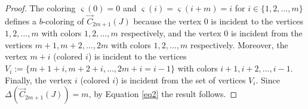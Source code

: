 \documentclass[10pt,a4paper]{amsart}
\begin{document}
\begin{proof}
The coloring $\varsigma(0)=0$ and $\varsigma(i)=\varsigma(i+m)=i$ for $i\in \{1,2,\ldots,m\}$ defines a $b$-coloring of $\overrightarrow{C}_{2m+1}(J)$ because the vertex $0$ is incident to the vertices  $1,2,\ldots, m$ with colors $1,2,\ldots, m$ respectively, and the vertex $0$ is incident from the vertices  $m+1,m+2,\ldots, 2m$ with colors $1,2,\ldots, m$ respectively. Moreover, the vertex $m+i$ (colored $i$) is incident to the vertices $V_i:=\{m+1+i,m+2+i, \ldots, 2m+i=i-1\}$ with colors $i+1,i+2,\ldots, i-1$. Finally, the vertex $i$ (colored $i$) is incident from the set of vertices $V_i$.
Since $\Delta(\overrightarrow{C}_{2m+1}(J))=m$, by Equation \ref{eq2} the result follows.



\end{proof}
\end{document}
